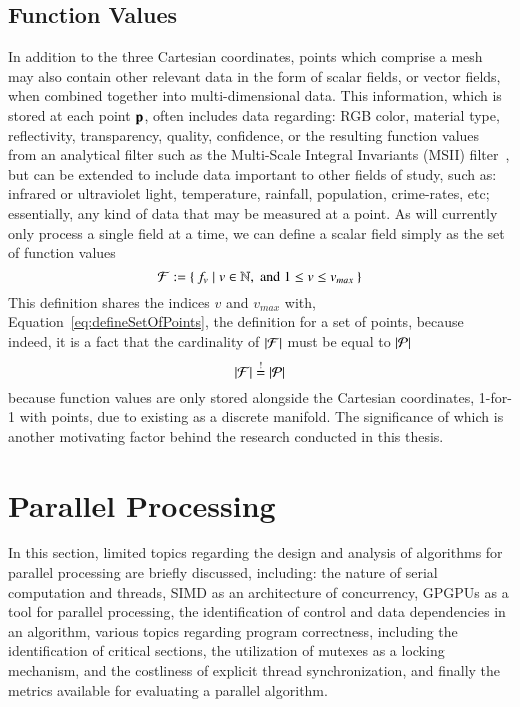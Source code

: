 \subsection{Function Values}
\label{ch2s3ssFV}
In addition to the three Cartesian coordinates, points which comprise a mesh may also contain other relevant data in the form of scalar fields, or vector fields, when combined together into multi-dimensional data. This information, which is stored at each point $\mathbf{p}$, often includes data regarding: RGB color, material type, reflectivity, transparency, quality, confidence, or the resulting function values from an analytical filter such as the Multi-Scale Integral Invariants (MSII) filter~\cite[p.~21]{Mara12}, but can be extended to include data important to other fields of study, such as: infrared or ultraviolet light, temperature, rainfall, population, crime-rates, etc; essentially, any kind of data that may be measured at a point. As  will currently only process a single field at a time, we can define a scalar field simply as the set of function values
%
\begin{equation}
	\mathcal{F} := \left \{\: f_v \mid v \in \mathbb{N}, \;\text{and}\; 1\leq v \leq v_{max} \:\right \}
	\label{eq:defineSetOfFunctionValues}
\end{equation}%
%
%
%
This definition shares the indices $v$ and $v_{max}$ with, Equation~\ref{eq:defineSetOfPoints}, the definition for a set of points, because indeed, it is a fact that the cardinality of $|\mathcal{F}|$ must be equal to $|\mathcal{P}|$
%
\begin{equation}
	|\mathcal{F}| \overset{!}{=} |\mathcal{P}|
\end{equation}
%
because function values are only stored alongside the Cartesian coordinates, 1-for-1 with points, due to \tdd{} existing as a discrete manifold. The significance of which is another motivating factor behind the research conducted in this thesis.

%
%
%
%
%
%
\section{Parallel Processing}
\label{ch2sPP}
In this section, limited topics regarding the design and analysis of algorithms for parallel processing are briefly discussed, including: the nature of serial computation and threads, SIMD as an architecture of concurrency, GPGPUs as a tool for parallel processing, the identification of control and data dependencies in an algorithm, various topics regarding program correctness, including the identification of critical sections, the utilization of mutexes as a locking mechanism, and the costliness of explicit thread synchronization, and finally the metrics available for evaluating a parallel algorithm.

